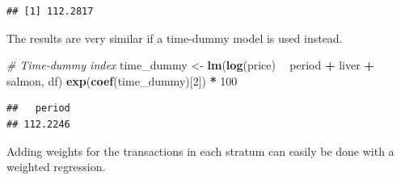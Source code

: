 \documentclass[]{article}
\newenvironment{Shaded}{\begin{snugshade}}{\end{snugshade}}
\newcommand{\CommentTok}[1]{\textcolor[rgb]{0.56,0.35,0.01}{\textit{#1}}}
\newcommand{\DataTypeTok}[1]{\textcolor[rgb]{0.13,0.29,0.53}{#1}}
\newcommand{\DecValTok}[1]{\textcolor[rgb]{0.00,0.00,0.81}{#1}}
\newcommand{\KeywordTok}[1]{\textcolor[rgb]{0.13,0.29,0.53}{\textbf{#1}}}
\newcommand{\NormalTok}[1]{#1}
\newcommand{\OperatorTok}[1]{\textcolor[rgb]{0.81,0.36,0.00}{\textbf{#1}}}
\newcommand{\StringTok}[1]{\textcolor[rgb]{0.31,0.60,0.02}{#1}}
\begin{document}
\begin{verbatim}
## [1] 112.2817
\end{verbatim}

The results are very similar if a time-dummy model is used instead.

\begin{Shaded}
\begin{Highlighting}[]
\CommentTok{# Time-dummy index}
\NormalTok{time_dummy <-}\StringTok{ }\KeywordTok{lm}\NormalTok{(}\KeywordTok{log}\NormalTok{(price) }\OperatorTok{~}\StringTok{ }\NormalTok{period }\OperatorTok{+}\StringTok{ }\NormalTok{liver }\OperatorTok{+}\StringTok{ }\NormalTok{salmon, df)}
\KeywordTok{exp}\NormalTok{(}\KeywordTok{coef}\NormalTok{(time_dummy)[}\DecValTok{2}\NormalTok{]) }\OperatorTok{*}\StringTok{ }\DecValTok{100}
\end{Highlighting}
\end{Shaded}

\begin{verbatim}
##   period 
## 112.2246
\end{verbatim}

Adding weights for the transactions in each stratum can easily be done with a weighted regression.

\begin{Shaded}
\end{Shaded}
\end{document}
